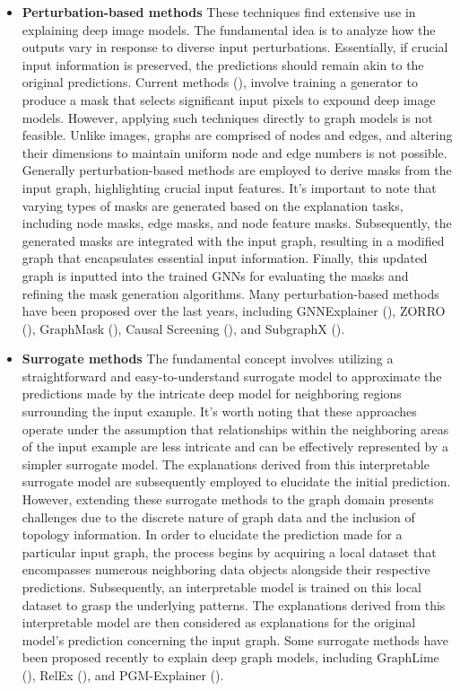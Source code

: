 \documentclass[binding=0.6cm]{sapthesis}
\newcommand{\mycite}[1]{(\cite{#1})}
\begin{document}
\begin{itemize}
    \item \textbf{Perturbation-based methods} These techniques find extensive use in explaining deep image models. The fundamental idea is to analyze how the outputs vary in response to diverse input perturbations. Essentially, if crucial input information is preserved, the predictions should remain akin to the original predictions. Current methods \mycite{dabkowski2017-saliency,yuan2020-discrete-masks,chen2018-learning}, involve training a generator to produce a mask that selects significant input pixels to expound deep image models. However, applying such techniques directly to graph models is not feasible. Unlike images, graphs are comprised of nodes and edges, and altering their dimensions to maintain uniform node and edge numbers is not possible. Generally perturbation-based methods are employed to derive masks from the input graph, highlighting crucial input features. It's important to note that varying types of masks are generated based on the explanation tasks, including node masks, edge masks, and node feature masks. Subsequently, the generated masks are integrated with the input graph, resulting in a modified graph that encapsulates essential input information. Finally, this updated graph is inputted into the trained GNNs for evaluating the masks and refining the mask generation algorithms. Many perturbation-based methods have been proposed over the last years, including GNNExplainer \mycite{ying2019-gnnexplainer}, ZORRO \mycite{funke2021-hard}, GraphMask \mycite{schlichtkrull2022-interpreting}, Causal Screening \mycite{wang2021-causal}, and SubgraphX \mycite{yuan2021-subgraphx}. 
    
    \item \textbf{Surrogate methods} The fundamental concept involves utilizing a straightforward and easy-to-understand surrogate model to approximate the predictions made by the intricate deep model for neighboring regions surrounding the input example. It's worth noting that these approaches operate under the assumption that relationships within the neighboring areas of the input example are less intricate and can be effectively represented by a simpler surrogate model. The explanations derived from this interpretable surrogate model are subsequently employed to elucidate the initial prediction. However, extending these surrogate methods to the graph domain presents challenges due to the discrete nature of graph data and the inclusion of topology information. In order to elucidate the prediction made for a particular input graph, the process begins by acquiring a local dataset that encompasses numerous neighboring data objects alongside their respective predictions. Subsequently, an interpretable model is trained on this local dataset to grasp the underlying patterns. The explanations derived from this interpretable model are then considered as explanations for the original model's prediction concerning the input graph. Some surrogate methods have been proposed recently to explain deep graph models, including GraphLime \mycite{huang2020-graphlime}, RelEx \mycite{zhang2021-relex}, and PGM-Explainer \mycite{vu2020-pgm-explainer}.
    

\end{itemize}
\end{document}

